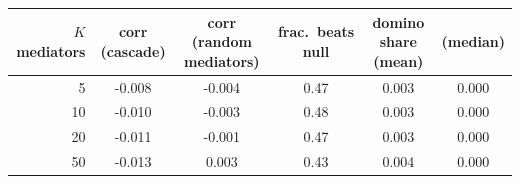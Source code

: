 \begin{tabular}{rccccc}
\toprule
$K$ mediators & corr (cascade) & corr (random mediators) & frac.\ beats null & domino share (mean) & (median) \\
\midrule
5 & -0.008 & -0.004 & 0.47 & 0.003 & 0.000 \\
10 & -0.010 & -0.003 & 0.48 & 0.003 & 0.000 \\
20 & -0.011 & -0.001 & 0.47 & 0.003 & 0.000 \\
50 & -0.013 & 0.003 & 0.43 & 0.004 & 0.000 \\
\bottomrule
\end{tabular}